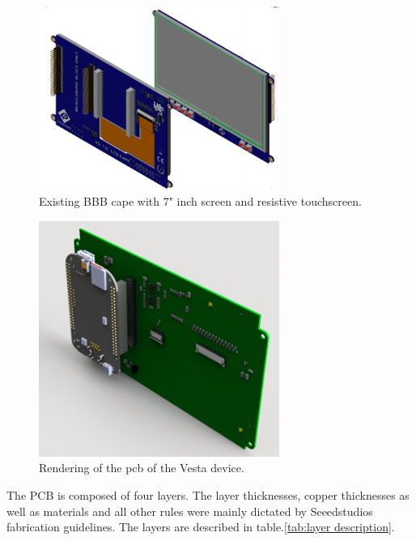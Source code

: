 \begin{figure}[h]
    \centering
    \includegraphics[width=0.7\textwidth,keepaspectratio]{chap/hardFig/4d_cape}
    \caption{Existing BBB cape with 7" inch screen and resistive touchscreen.}
    \label{fig:4ds cape}
\end{figure}

\begin{figure}[!ht]
    \centering
    \includegraphics[width=0.7\textwidth,keepaspectratio]{chap/hardFig/rendu_pcb_trois_quarts}
    \caption{Rendering of the pcb of the Vesta device.}
    \label{fig:vesta cape}
\end{figure}


The PCB is composed of four layers. The layer thicknesses, copper thicknesses as well as materials and all other rules were mainly dictated by Seeedstudios fabrication guidelines. The layers are described in table.\ref{tab:layer description}.

